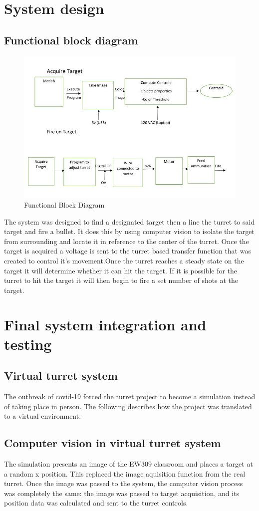 \documentclass{article}
\begin{document}
\section{System design}
\subsection{Functional block diagram}
\begin{figure}
    \centering
    \includegraphics[height=5cm width=4cm]{overall block diagram.JPG}
    \caption{Functional Block Diagram}
    \label{fig:fun diagr}
\end{figure}
The system was designed to find a designated target then a line the turret to said target and fire a bullet. It does this by using computer vision to isolate the target from surrounding and locate it in reference to the center of the turret. Once the target is acquired a voltage is sent to the turret based transfer function that was created to control it's movement.Once the turret reaches a steady state on the target it will determine whether it can hit the target. If it is possible for the turret to hit the target it will then begin to fire a set number of shots at the target. 
 







\section{Final system integration and testing}
\subsection{Virtual turret system}
The outbreak of covid-19 forced the turret project to become a simulation instead of taking place in person. The following describes how the project was translated to a virtual environment.
\subsection{Computer vision in virtual turret system}
The simulation presents an image of the EW309 classroom and places a target at a random x position. This replaced the image aquisition function from the real turret. Once the image was passed to the system, the computer vision process was completely the same: the image was passed to target acquisition, and its position data was calculated and sent to the turret controls.
\end{document}
